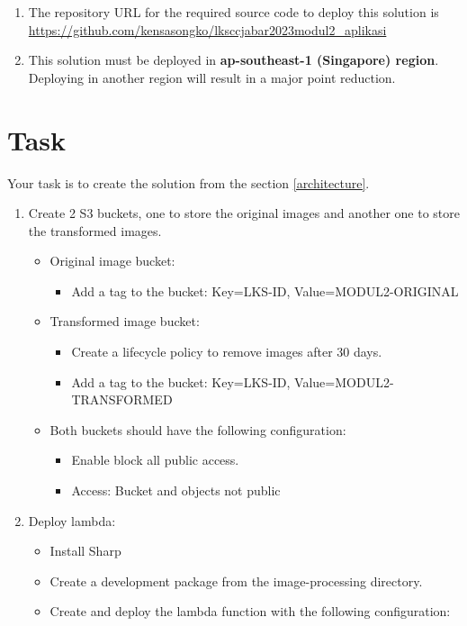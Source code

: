 \documentclass{article}
\begin{document}
\begin{enumerate}
\item The repository URL for the required source code to deploy this solution is \href{https://github.com/kensasongko/lksccjabar2023modul2_aplikasi}{https://github.com/kensasongko/lksccjabar2023modul2\_aplikasi}
\item This solution must be deployed in \textbf{ap-southeast-1 (Singapore) region}. Deploying in another region will result in a major point reduction.
\end{enumerate}

\section{Task}
Your task is to create the solution from the section \ref{architecture}.
\begin{enumerate}
\item Create 2 S3 buckets, one to store the original images and another one to store the transformed images.
  \begin{itemize}
    \item Original image bucket:
    \begin{itemize}
      \item Add a tag to the bucket: Key=LKS-ID, Value=MODUL2-ORIGINAL
    \end{itemize}
    \item Transformed image bucket:
    \begin{itemize}
      \item Create a lifecycle policy to remove images after 30 days.
      \item Add a tag to the bucket: Key=LKS-ID, Value=MODUL2-TRANSFORMED
    \end{itemize}
    \item Both buckets should have the following configuration:
    \begin{itemize}
      \item Enable block all public access.
      \item Access: Bucket and objects not public
    \end{itemize}
  \end{itemize}
\item Deploy lambda:
  \begin{itemize}
    \item Install Sharp
    \item Create a development package from the image-processing directory.
    \item Create and deploy the lambda function with the following configuration:

\end{itemize}
\end{enumerate}
\end{document}
